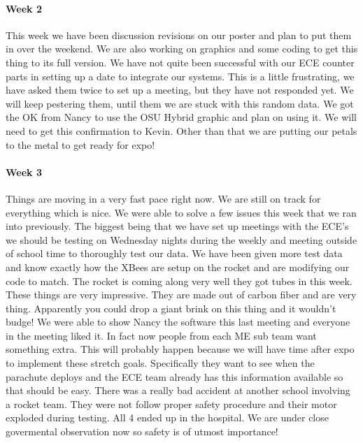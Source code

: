 \documentclass[10pt,draftclsnofoot,onecolumn,retainorgcmds]{IEEEtran}
\begin{document}
\paragraph{Week 2}
This week we have been discussion revisions on our poster and plan to put them in over the weekend. We are also working on graphics and some coding to get this thing to its full version. We have not quite been successful with our ECE counter parts in setting up a date to integrate our systems. This is a little frustrating, we have asked them twice to set up a meeting, but they have not responded yet. We will keep pestering them, until them we are stuck with this random data. We got the OK from Nancy to use the OSU Hybrid graphic and plan on using it. We will need to get this confirmation to Kevin. Other than that we are putting our petals to the metal to get ready for expo!\\
\paragraph{Week 3}
Things are moving in a very fast pace right now. We are still on track for everything which is nice. We were able to solve a few issues this week that we ran into previously. The biggest being that we have set up meetings with the ECE's we should be testing on Wednesday nights during the weekly and meeting outside of school time to thoroughly test our data. We have been given more test data and know exactly how the XBees are setup on the rocket and are modifying our code to match. The rocket is coming along very well they got tubes in this week. These things are very impressive. They are made out of carbon fiber and are very thing. Apparently you could drop a giant brink on this thing and it wouldn't budge! We were able to show Nancy the software this last meeting and everyone in the meeting liked it. In fact now people from each ME sub team want something extra. This will probably happen because we will have time after expo to implement these stretch goals. Specifically they want to see when the parachute deploys and the ECE team already has this information available so that should be easy. There was a really bad accident at another school involving a rocket team. They were not follow proper safety procedure and their motor exploded during testing. All 4 ended up in the hospital. We are under close govermental observation now so safety is of utmost importance!\\
\end{document}
